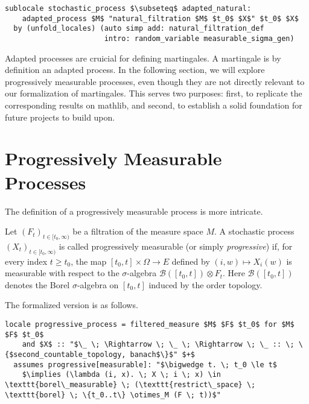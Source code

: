 \begin{isalemma}
{\small
\begin{lstlisting}[style=isabelle]
sublocale stochastic_process $\subseteq$ adapted_natural: 
	adapted_process $M$ "natural_filtration $M$ $t_0$ $X$" $t_0$ $X$ 
  by (unfold_locales) (auto simp add: natural_filtration_def 
  					   intro: random_variable measurable_sigma_gen) 
\end{lstlisting}
}
\end{isalemma}

Adapted processes are cruicial for defining martingales. A martingale is by definition an adapted process. In the following section, we will explore progressively measurable processes, even though they are not directly relevant to our formalization of martingales. This serves two purposes: first, to replicate the corresponding results on \textsf{mathlib}, and second, to establish a solid foundation for future projects to build upon.

\section{Progressively Measurable Processes}

The definition of a progressively measurable process is more intricate.

\begin{definition}
	Let $(F_t)_{t \in [t_0, \infty)}$ be a filtration of the measure space $M$. A stochastic process $(X_t)_{t \in [t_0, \infty)}$ is called progressively measurable (or simply \textit{progressive}) if, for every index $t \ge t_0$, the map $[t_0, t] \times \Omega \rightarrow E$ defined by $(i, w) \mapsto X_i(w)$ is measurable with respect to the $\sigma$-algebra $\mathcal{B}([t_0, t]) \otimes F_t$. Here $\mathcal{B}([t_0, t])$ denotes the Borel $\sigma$-algebra on $[t_0, t]$ induced by the order topology.
\end{definition}

The formalized version is as follows.

\begin{isadefinition}
{\small
\begin{lstlisting}[style=isabelle]
locale progressive_process = filtered_measure $M$ $F$ $t_0$ for $M$ $F$ $t_0$
	and $X$ :: "$\_ \; \Rightarrow \; \_ \; \Rightarrow \; \_ :: \; \{$second_countable_topology, banach$\}$" $+$
  assumes progressive[measurable]: "$\bigwedge t. \; t_0 \le t$
	$\implies (\lambda (i, x). \; X \; i \; x) \in \texttt{borel\_measurable} \; (\texttt{restrict\_space} \; \texttt{borel} \; \{t_0..t\} \otimes_M (F \; t))$"
\end{lstlisting}
}
\end{isadefinition}

